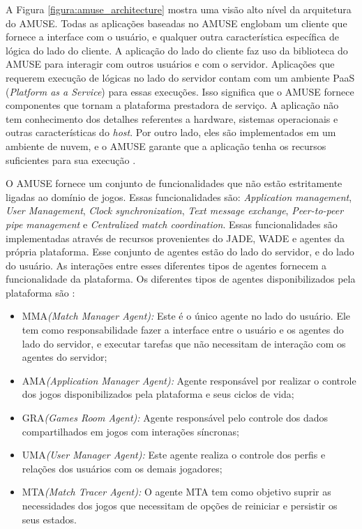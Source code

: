 A Figura \ref{figura:amuse_architecture} mostra uma visão alto nível da arquitetura do AMUSE. Todas as aplicações baseadas no AMUSE englobam um cliente que fornece a interface com o usuário, e qualquer outra característica específica de lógica do lado do cliente. A aplicação do lado do cliente faz uso da biblioteca do AMUSE para interagir com outros usuários e com o servidor.
Aplicações que requerem execução de lógicas no lado do servidor contam com um ambiente PaaS (\textit{Platform as a Service}) para essas execuções. Isso significa que o AMUSE fornece componentes que tornam a plataforma prestadora de serviço. A aplicação não tem conhecimento dos detalhes referentes a hardware, sistemas operacionais e outras características do \textit{host}. Por outro lado, eles são implementados em um ambiente de nuvem, e o AMUSE garante que a aplicação tenha os recursos suficientes para sua execução \cite{amuseStartupGuide}.

O AMUSE fornece um conjunto de funcionalidades que não estão estritamente ligadas ao domínio de jogos. Essas funcionalidades são: \textit{Application management}, \textit{User Management}, \textit{Clock synchronization}, \textit{Text message exchange}, \textit{Peer-to-peer pipe management} e \textit{Centralized match coordination}. Essas funcionalidades são implementadas através de recursos provenientes do JADE, WADE e agentes da própria plataforma. Esse conjunto de agentes estão do lado do servidor, e do lado do usuário. As interações entre esses diferentes tipos de agentes fornecem a funcionalidade da plataforma. Os diferentes tipos de agentes disponibilizados pela plataforma são \cite{bergenti2015}:

\begin{itemize}
  \item MMA\textit{(Match Manager Agent):} Este é o único agente no lado do usuário. Ele tem como responsabilidade fazer a interface entre o usuário e os agentes do lado do servidor, e executar tarefas que não necessitam de interação com os agentes do servidor;
  \item AMA\textit{(Application Manager Agent):} Agente responsável por realizar o controle dos jogos disponibilizados pela plataforma e seus ciclos de vida;
  \item GRA\textit{(Games Room Agent):} Agente responsável pelo controle dos dados compartilhados em jogos com interações síncronas;
  \item UMA\textit{(User Manager Agent):} Este agente realiza o controle dos perfis e relações dos usuários com os demais jogadores;
  \item MTA\textit{(Match Tracer Agent):} O agente MTA tem como objetivo suprir as necessidades dos jogos que necessitam de opções de reiniciar e persistir os seus estados.
\end{itemize}


